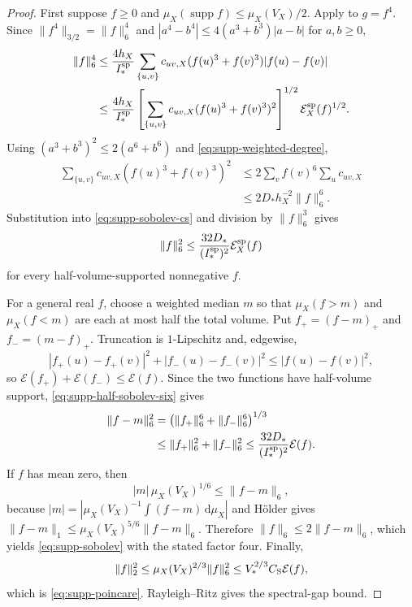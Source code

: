 \documentclass[11pt]{article}
\numberwithin{equation}{section}
\theoremstyle{definition}
\theoremstyle{remark}
\newcommand{\dd}{\mathrm d}
\newcommand{\supp}{\operatorname{supp}}
\begin{document}
\begin{proof}
First suppose $f\ge0$ and $\mu_X(\supp f)\le\mu_X(V_X)/2$.  Apply
 to $g=f^4$.  Since
$\|f^4\|_{3/2}=\|f\|_6^4$ and
$|a^4-b^4|\le4(a^3+b^3)|a-b|$ for $a,b\ge0$,
\begin{align}
 \|f\|_6^4
 &\le \frac{4h_X}{I_*^{\rm sp}}
 \sum_{\{u,v\}}c_{uv,X}(f(u)^3+f(v)^3)|f(u)-f(v)| \\
 &\le \frac{4h_X}{I_*^{\rm sp}}
 \left[\sum_{\{u,v\}}c_{uv,X}(f(u)^3+f(v)^3)^2\right]^{1/2}
 \mathcal E_X^{\rm sp}(f)^{1/2}.
 \label{eq:supp-sobolev-cs}
\end{align}
Using $(a^3+b^3)^2\le2(a^6+b^6)$ and
\eqref{eq:supp-weighted-degree},
\begin{align}
 \sum_{\{u,v\}}c_{uv,X}(f(u)^3+f(v)^3)^2
 &\le2\sum_v f(v)^6\sum_uc_{uv,X} \\
 &\le2D_*h_X^{-2}\|f\|_6^6.
 \label{eq:supp-degree-six}
\end{align}
Substitution into \eqref{eq:supp-sobolev-cs} and division by
$\|f\|_6^3$ gives
\begin{equation}
 \|f\|_6^2
 \le \frac{32D_*}{(I_*^{\rm sp})^2}\mathcal E_X^{\rm sp}(f)
 \label{eq:supp-half-sobolev-six}
\end{equation}
for every half-volume-supported nonnegative $f$.

For a general real $f$, choose a weighted median $m$ so that
$\mu_X(f>m)$ and $\mu_X(f<m)$ are each at most half the total volume.  Put
$f_+=(f-m)_+$ and $f_-=(m-f)_+$.  Truncation is $1$-Lipschitz and, edgewise,
\begin{equation}
 |f_+(u)-f_+(v)|^2+|f_-(u)-f_-(v)|^2
 \le |f(u)-f(v)|^2,
 \label{eq:supp-truncation-energy}
\end{equation}
so
$\mathcal E(f_+)+\mathcal E(f_-)\le\mathcal E(f)$.  Since the two functions
have half-volume support, \eqref{eq:supp-half-sobolev-six} gives
\begin{align}
 \|f-m\|_6^2
 &=\bigl(\|f_+\|_6^6+\|f_-\|_6^6\bigr)^{1/3} \\
 &\le \|f_+\|_6^2+\|f_-\|_6^2
 \le \frac{32D_*}{(I_*^{\rm sp})^2}\mathcal E(f).
 \label{eq:supp-median-six}
\end{align}
If $f$ has mean zero, then
\begin{equation}
 |m|\,\mu_X(V_X)^{1/6}
 \le \|f-m\|_6,
 \label{eq:supp-median-mean}
\end{equation}
because
$|m|=|\mu_X(V_X)^{-1}\int(f-m)\,\dd\mu_X|$ and H\"older gives
$\|f-m\|_1\le\mu_X(V_X)^{5/6}\|f-m\|_6$.  Therefore
$\|f\|_6\le2\|f-m\|_6$, which yields \eqref{eq:supp-sobolev} with the
stated factor four.  Finally,
\begin{equation}
 \|f\|_2^2\le\mu_X(V_X)^{2/3}\|f\|_6^2
 \le V_*^{2/3}C_{\rm S}\mathcal E(f),
\end{equation}
which is \eqref{eq:supp-poincare}.  Rayleigh--Ritz gives the spectral-gap
bound.
\end{proof}
\end{document}
